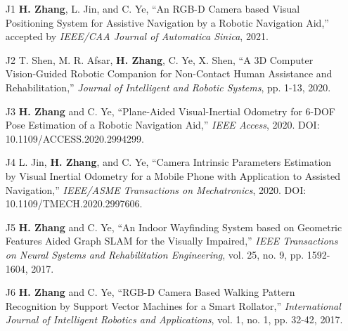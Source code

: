 

\begin{justify}
	\begin{itemize}[before=\fontsize{9pt}{1em}\bodyfontlight\upshape\color{text},leftmargin=3ex, nosep, noitemsep]
		\setlength{\parskip}{0pt}
		\renewcommand{\labelitemi}{\bullet}
		\item[J1]{\textbf{H. Zhang}, L. Jin, and C. Ye, “An RGB-D Camera based Visual Positioning System for Assistive Navigation by a Robotic Navigation Aid,” accepted by \emph{IEEE/CAA Journal of Automatica Sinica}, 2021.}
		\item[J2]{T. Shen, M. R. Afsar, \textbf{H. Zhang}, C. Ye, X. Shen, “A 3D Computer Vision-Guided Robotic Companion for Non-Contact Human Assistance and Rehabilitation,” \emph{Journal of Intelligent and Robotic Systems}, pp. 1-13, 2020.}
		\item[J3]{\textbf{H. Zhang} and C. Ye, “Plane-Aided Visual-Inertial Odometry for 6-DOF Pose Estimation of a Robotic Navigation Aid,” \emph{IEEE Access}, 2020. DOI: 10.1109/ACCESS.2020.2994299.}
		\item[J4]{L. Jin, \textbf{H. Zhang}, and C. Ye, “Camera Intrinsic Parameters Estimation by Visual Inertial Odometry for a Mobile Phone with Application to Assisted Navigation,” \emph{IEEE/ASME Transactions on Mechatronics}, 2020. DOI: 10.1109/TMECH.2020.2997606.}
		\item[J5]{\textbf{H. Zhang} and C. Ye, “An Indoor Wayfinding System based on Geometric Features Aided Graph SLAM for the Visually Impaired,” \emph{IEEE Transactions on Neural Systems and Rehabilitation Engineering}, vol. 25, no. 9, pp. 1592-1604, 2017.}
		\item[J6]{\textbf{H. Zhang} and C. Ye, “RGB-D Camera Based Walking Pattern Recognition by Support Vector Machines for a Smart Rollator,” \emph{International Journal of Intelligent Robotics and Applications}, vol. 1, no. 1, pp. 32-42, 2017.}
	\end{itemize}
\end{justify}


